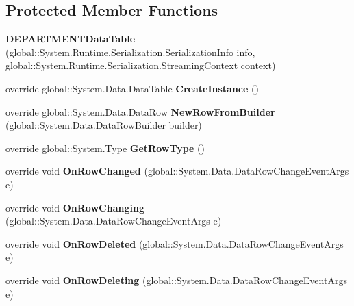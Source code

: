 \subsection*{Protected Member Functions}
\begin{CompactItemize}
\item 
\textbf{DEPARTMENTDataTable} (global::System.Runtime.Serialization.SerializationInfo info, global::System.Runtime.Serialization.StreamingContext context)\label{class_automatic_medical_system_1_1_data_set1_1_1_d_e_p_a_r_t_m_e_n_t_data_table_bd68655f27713ad7cf38514091765298}

\item 
override global::System.Data.DataTable \textbf{CreateInstance} ()\label{class_automatic_medical_system_1_1_data_set1_1_1_d_e_p_a_r_t_m_e_n_t_data_table_faef853d86476f6c61211596068e987d}

\item 
override global::System.Data.DataRow \textbf{NewRowFromBuilder} (global::System.Data.DataRowBuilder builder)\label{class_automatic_medical_system_1_1_data_set1_1_1_d_e_p_a_r_t_m_e_n_t_data_table_5d8d2996844a68a22440c16ef5d91900}

\item 
override global::System.Type \textbf{GetRowType} ()\label{class_automatic_medical_system_1_1_data_set1_1_1_d_e_p_a_r_t_m_e_n_t_data_table_40071ab004206ba8c8f6cc5a1812e2d6}

\item 
override void \textbf{OnRowChanged} (global::System.Data.DataRowChangeEventArgs e)\label{class_automatic_medical_system_1_1_data_set1_1_1_d_e_p_a_r_t_m_e_n_t_data_table_2a9fbc309c26f9e872ffd4bcb45b7c29}

\item 
override void \textbf{OnRowChanging} (global::System.Data.DataRowChangeEventArgs e)\label{class_automatic_medical_system_1_1_data_set1_1_1_d_e_p_a_r_t_m_e_n_t_data_table_06efe6f15ba0635d97db2a6d23300a3f}

\item 
override void \textbf{OnRowDeleted} (global::System.Data.DataRowChangeEventArgs e)\label{class_automatic_medical_system_1_1_data_set1_1_1_d_e_p_a_r_t_m_e_n_t_data_table_e4994a9e6a6e8b41a48679b9802bb197}

\item 
override void \textbf{OnRowDeleting} (global::System.Data.DataRowChangeEventArgs e)\label{class_automatic_medical_system_1_1_data_set1_1_1_d_e_p_a_r_t_m_e_n_t_data_table_231e95ff272fa1e49c81c00f1a5db4e2}

\end{CompactItemize}
